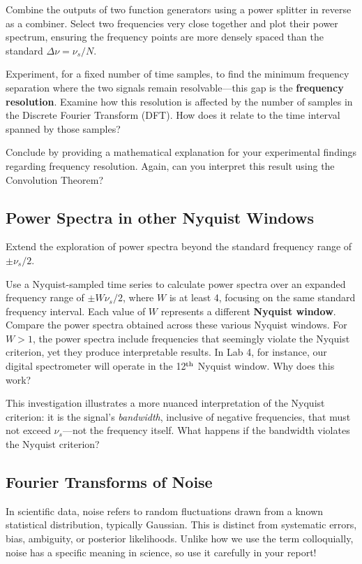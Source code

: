 \documentclass[11pt,preprint]{aastex}
\begin{document}
Combine the outputs of two function generators using a power splitter in reverse as a combiner. Select two frequencies very close together and plot their power spectrum, ensuring the frequency points are more densely spaced than the standard $\Delta \nu = \nu_s/N$.

Experiment, for a fixed number of time samples, to find the minimum frequency separation where the two signals remain resolvable---this gap is the \textbf{frequency resolution}. Examine how this resolution is affected by the number of samples in the Discrete Fourier Transform (DFT). How does it relate to the time interval spanned by those samples?

Conclude by providing a mathematical explanation for your experimental findings regarding frequency resolution.
Again, can you interpret this result using the Convolution Theorem?


\subsection{Power Spectra in other Nyquist Windows}

\noindent
Extend the exploration of power spectra beyond the standard frequency range of $\pm \nu_s/2$. 

Use a Nyquist-sampled time series to calculate power spectra over an expanded frequency range of $\pm W \nu_s/2$, where $W$ is at least 4, focusing on the same standard frequency interval.
Each value of $W$ represents a different \textbf{ Nyquist window}.
Compare the power spectra obtained across these various Nyquist windows.
For $W > 1$, the power spectra include frequencies that seemingly violate the Nyquist criterion, yet they produce interpretable results. In Lab 4, for instance, our digital spectrometer will operate in the 12$^{\rm th}$ Nyquist window. Why does this work?

This investigation illustrates a more nuanced interpretation of the Nyquist criterion: it is the signal's {\it bandwidth}, inclusive of negative frequencies, that must not exceed $\nu_s$---not the frequency itself. What happens if the bandwidth violates the Nyquist criterion?


\subsection{Fourier Transforms of Noise}

\noindent
In scientific data, noise refers to random fluctuations drawn from a known statistical distribution, typically Gaussian.
This is distinct from systematic errors, bias, ambiguity, or posterior likelihoods.
Unlike how we use the term colloquially, noise has a specific meaning in science, so use it carefully in your report!
\end{document}
